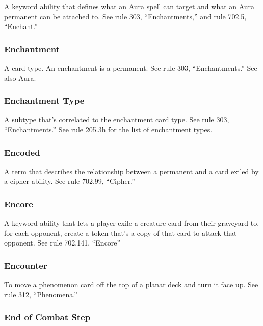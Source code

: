 {{{{{{{A keyword ability that defines what an Aura spell can target and what an Aura permanent can be attached to. See rule 303, “Enchantments,” and rule 702.5, “Enchant.”

\subsubsection*{Enchantment}

A card type. An enchantment is a permanent. See rule 303, “Enchantments.” See also Aura.

\subsubsection*{Enchantment Type}

A subtype that’s correlated to the enchantment card type. See rule 303, “Enchantments.” See rule 205.3h for the list of enchantment types.

\subsubsection*{Encoded}

A term that describes the relationship between a permanent and a card exiled by a cipher ability. See rule 702.99, “Cipher.”

\subsubsection*{Encore}

A keyword ability that lets a player exile a creature card from their graveyard to, for each opponent, create a token that’s a copy of that card to attack that opponent. See rule 702.141, “Encore”

\subsubsection*{Encounter}

To move a phenomenon card off the top of a planar deck and turn it face up. See rule 312, “Phenomena.”

\subsubsection*{End of Combat Step}

}}}}}}}
